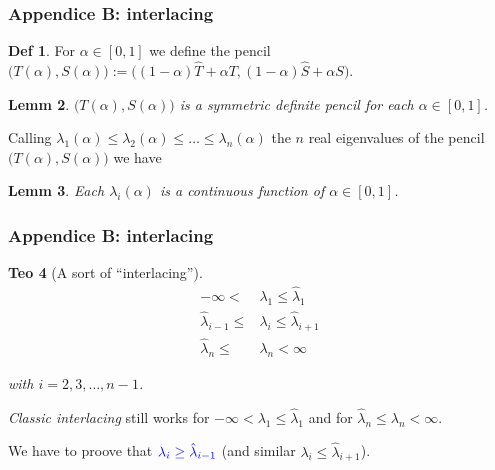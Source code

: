 \documentclass{beamer}
\theoremstyle{definition} \newtheorem{de}{Def}
\theoremstyle{remark} \newtheorem{os}[de]{Remark}
\theoremstyle{plain} \newtheorem{te}[de]{Teo}
\theoremstyle{plain} \newtheorem{co}[de]{Cor}
\theoremstyle{plain} \newtheorem{pr}[de]{Prop}
\theoremstyle{plain} \newtheorem{lem}[de]{Lemm}
\theoremstyle{remark} \newtheorem{rem}[de]{Remark}
\begin{document}
\begin{frame}[label=Interlacing]
  \frametitle{Appendice B: interlacing}

  \begin{de}
    For $\alpha\in[0,1]$ we define the pencil $\big( T(\alpha), S(\alpha) \big) := \big( (1-\alpha)\hat T + \alpha T, (1-\alpha)\hat S + \alpha S \big)$.
  \end{de}

  \begin{lem}
    $\big( T(\alpha), S(\alpha) \big)$ is a \emph{symmetric definite} pencil for each $\alpha\in[0,1]$.
  \end{lem}

  Calling $\lambda_1(\alpha)\le \lambda_2(\alpha)\le \dots \le \lambda_n(\alpha)$ the $n$ real eigenvalues of the pencil  $\big( T(\alpha), S(\alpha) \big)$ we have

  \begin{lem}
    Each $\lambda_i(\alpha)$ is a continuous function of $\alpha\in[0,1]$.
  \end{lem}

\end{frame}

\begin{frame}
  \frametitle{Appendice B: interlacing}

  \begin{te}[A sort of ``interlacing'']
    \begin{align*}
      -\infty < &\lambda_1 \le \hat\lambda_1 \\
      \hat\lambda_{i-1} \le &\lambda_i \le \hat\lambda_{i+1} \\
      \hat\lambda_n \le &\lambda_n < \infty
    \end{align*}

    with $i=2,3,\dots,n-1$.
  \end{te}

  \pause


  \emph{Classic interlacing} still works for $-\infty < \lambda_1 \le \hat\lambda_1$ and for $\hat\lambda_n \le \lambda_n < \infty$.

  \pause

  We have to proove that $\textcolor{blue}{\lambda_i \ge \hat\lambda_{i-1}}$ (and similar $\lambda_i \le \hat\lambda_{i+1}$).

\end{frame}
\end{document}
